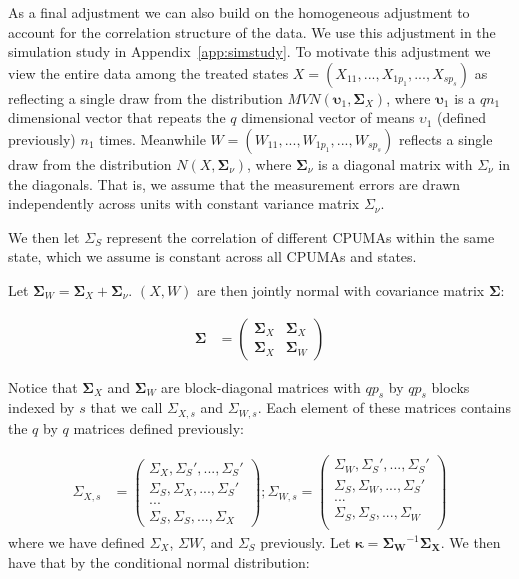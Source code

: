 As a final adjustment we can also build on the homogeneous adjustment to account for the correlation structure of the data. We use this adjustment in the simulation study in Appendix~\ref{app:simstudy}. To motivate this adjustment we view the entire data among the treated states $X = (X_{11}, ..., X_{1p_1}, ..., X_{sp_s})$ as reflecting a single draw from the distribution $MVN(\boldsymbol{\upsilon}_1, \mathbf{\Sigma}_X)$, where $\boldsymbol{\upsilon}_1$ is a $qn_1$ dimensional vector that repeats the $q$ dimensional vector of means $\upsilon_1$ (defined previously) $n_1$ times. Meanwhile $W = (W_{11}, ..., W_{1p_1}, ..., W_{sp_s})$ reflects a single draw from the distribution $N(X, \boldsymbol{\Sigma}_{\nu})$, where $\boldsymbol{\Sigma}_{\nu}$ is a diagonal matrix with $\Sigma_{\nu}$ in the diagonals. That is, we assume that the measurement errors are drawn independently across units with constant variance matrix $\Sigma_{\nu}$.

We then let $\Sigma_S$ represent the correlation of different CPUMAs within the same state, which we assume is constant across all CPUMAs and states. 

Let $\boldsymbol{\Sigma}_W = \boldsymbol{\Sigma}_X + \boldsymbol{\Sigma}_{\nu}$. $(X, W)$ are then jointly normal with covariance matrix $\boldsymbol{\Sigma}$: 

\begin{align*}
\boldsymbol{\Sigma} &= \begin{pmatrix}
\mathbf{\Sigma}_X & \mathbf{\Sigma}_X \\
\mathbf{\Sigma}_X & \mathbf{\Sigma}_W
\end{pmatrix} 
\end{align*}

Notice that $\mathbf{\Sigma}_X$ and $\mathbf{\Sigma}_W$ are block-diagonal matrices with $qp_s$ by $qp_s$ blocks indexed by $s$ that we call $\Sigma_{X, s}$ and $\Sigma_{W, s}$. Each element of these matrices contains the $q$ by $q$ matrices defined previously: 

\begin{align*}
\Sigma_{X, s} &= \begin{pmatrix}
\Sigma_{X}, \Sigma_{S}', ..., \Sigma_{S}' \\
\Sigma_{S}, \Sigma_{X}, ..., \Sigma_{S}' \\
... \\
\Sigma_{S}, \Sigma_{S}, ..., \Sigma_{X}
\end{pmatrix};
\Sigma_{W, s} = \begin{pmatrix}
\Sigma_{W}, \Sigma_{S}', ..., \Sigma_{S}' \\
\Sigma_{S}, \Sigma_{W}, ..., \Sigma_{S}' \\
... \\
\Sigma_{S}, \Sigma_{S}, ..., \Sigma_{W} \\
\end{pmatrix}
\end{align*}
%
where we have defined $\Sigma_{X}$, $\Sigma{W}$, and $\Sigma_{S}$ previously. 
Let $\boldsymbol{\kappa} = \mathbf{\Sigma_W}^{-1}\mathbf{\Sigma_X}$. We then have that by the conditional normal distribution:

